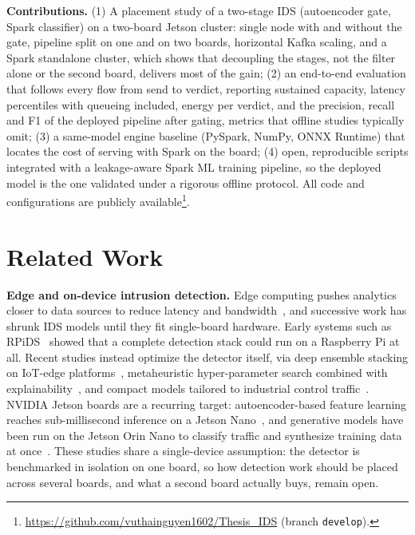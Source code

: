 \documentclass[runningheads]{llncs}
\begin{document}
\textbf{Contributions.}
(1) A placement study of a two-stage IDS (autoencoder gate, Spark classifier) on a two-board Jetson cluster: single node with and without the gate, pipeline split on one and on two boards, horizontal Kafka scaling, and a Spark standalone cluster, which shows that decoupling the stages, not the filter alone or the second board, delivers most of the gain;
(2) an end-to-end evaluation that follows every flow from send to verdict, reporting sustained capacity, latency percentiles with queueing included, energy per verdict, and the precision, recall and F1 of the deployed pipeline after gating, metrics that offline studies typically omit;
(3) a same-model engine baseline (PySpark, NumPy, ONNX Runtime) that locates the cost of serving with Spark on the board;
(4) open, reproducible scripts integrated with a leakage-aware Spark ML training pipeline, so the deployed model is the one validated under a rigorous offline protocol. All code and configurations are publicly available\footnote{\url{https://github.com/vuthainguyen1602/Thesis_IDS} (branch \texttt{develop}).}.

\section{Related Work}

\textbf{Edge and on-device intrusion detection.} Edge computing pushes analytics closer to data sources to reduce latency and bandwidth~\cite{shi2016edge,hamdan2020edge}, and successive work has shrunk IDS models until they fit single-board hardware. Early systems such as RPiDS~\cite{sforzin2016rpids} showed that a complete detection stack could run on a Raspberry Pi at all. Recent studies instead optimize the detector itself, via deep ensemble stacking on IoT-edge platforms~\cite{baalaji2025ensemble}, metaheuristic hyper-parameter search combined with explainability~\cite{asghar2026hedid}, and compact models tailored to industrial control traffic~\cite{zhang2026edgeics}. NVIDIA Jetson boards are a recurring target: autoencoder-based feature learning reaches sub-millisecond inference on a Jetson Nano~\cite{hasan2025iiot}, and generative models have been run on the Jetson Orin Nano to classify traffic and synthesize training data at once~\cite{diazgorrin2026jetson}. These studies share a single-device assumption: the detector is benchmarked in isolation on one board, so how detection work should be placed across several boards, and what a second board actually buys, remain open.
\end{document}
